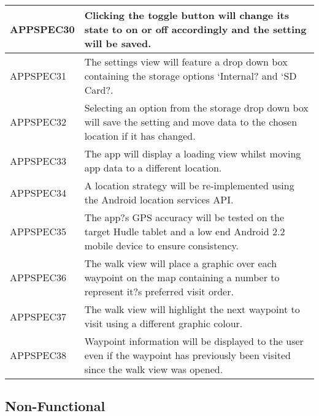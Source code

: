 \documentclass[11pt,a4paper]{article}
\begin{document}
\begin{longtable}{|p{2.5cm}p{13cm}|}
APPSPEC30 & Clicking the toggle button will change its state to on or off accordingly and the setting will be saved. \\ \hline
APPSPEC31 & The settings view will feature a drop down box containing the storage options `Internal? and `SD Card?. \\ \hline
APPSPEC32 & Selecting an option from the storage drop down box will save the setting and move data to the chosen location if it has changed. \\ \hline
APPSPEC33 & The app will display a loading view whilst moving app data to a different location. \\ \hline
APPSPEC34 & A location strategy will be re-implemented using the Android location services API. \\ \hline
APPSPEC35 & The app?s GPS accuracy will be tested on the target Hudle tablet and a low end Android 2.2 mobile device to ensure consistency. \\ \hline
APPSPEC36 & The walk view will place a graphic over each waypoint on the map containing a number to represent it?s preferred visit order. \\ \hline
APPSPEC37 & The walk view will highlight the next waypoint to visit using a different graphic colour. \\ \hline
APPSPEC38 & Waypoint information will be displayed to the user even if the waypoint has previously been visited since the walk view was opened. \\ \hline
\end{longtable}


\subsection{Non-Functional}
\label{sec:non-func-specs}
\end{document}
